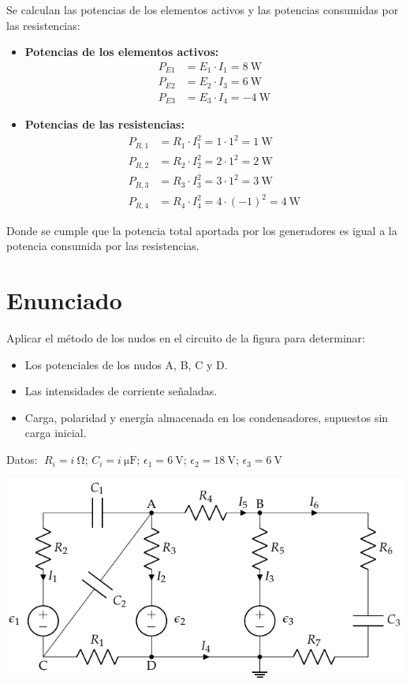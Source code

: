 Se calculan las potencias de los elementos activos y las potencias consumidas por las resistencias:
\begin{itemize}
\item \textbf{Potencias de los elementos activos:}
    \begin{align*}
      P_{E1} &= E_1 \cdot I_1 = \qty{8}{\watt}\\
      P_{E2} &= E_2 \cdot I_3 = \qty{6}{\watt}\\
      P_{E3} &= E_3 \cdot I_4 = -\qty{4}{\watt}
    \end{align*}
\item \textbf{Potencias de las resistencias:}
    \begin{align*}
      P_{R,1}&= R_1 \cdot I_1^2=1\cdot 1^2 = \qty{1}{\watt}\\
      P_{R,2}&= R_2 \cdot I_2^2=2\cdot 1^2 = \qty{2}{\watt}\\
      P_{R,3}&= R_3 \cdot I_3^2=3\cdot 1^2 = \qty{3}{\watt}\\
      P_{R,4}&= R_4 \cdot I_4^2=4\cdot (-1)^2 = \qty{4}{\watt}
    \end{align*}
\end{itemize}
Donde se cumple que la potencia total aportada por los generadores es igual a la potencia consumida por las resistencias.


\section{Enunciado}
Aplicar el método de los nudos en el circuito de la figura para
determinar:
\begin{itemize}
\item Los potenciales de los nudos A, B, C y D.
\item Las intensidades de corriente señaladas.
\item Carga, polaridad y energía almacenada en los condensadores,
  supuestos sin carga inicial.
\end{itemize}
Datos:
$ \; R_i = \qty[parse-numbers=false]{i}{\ohm}$; \; $C_i = \qty[parse-numbers=false]{i}{\micro\farad}$; \; $\epsilon_1 = \qty{6}{\volt}$; \; $\epsilon_2 =
\qty{18}{\volt}$; \; $\epsilon_3 = \qty{6}{\volt}$

\begin{center}
  \includegraphics[]{figuras/nudos_condensadores.pdf}
\end{center}

